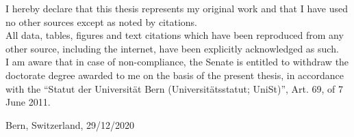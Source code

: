 
\begin{declaration}
	\addchaptertocentry{\authorshipname} %
	
	\vspace{1cm}
	
	 \vspace{0.5cm}
	
	 \vspace{2cm}
	
	{\noindent I  hereby  declare  that  this  thesis represents my  original  work and  that  I  have  used  no  other sources except as noted by citations.\\
		All  data,  tables,  figures  and  text  citations  which  have  been  reproduced  from  any  other source, including the internet, have been explicitly acknowledged as such.\\
		I am aware that in case of non-compliance, the Senate is entitled to withdraw the doctorate degree awarded to me on the basis of the present thesis, in accordance with the “Statut der Universität Bern (Universitätsstatut; UniSt)”, Art. 69, of 7 June 2011.\par} \vspace{1cm}
	
	
	  Bern, Switzerland, 29/12/2020

	  \vspace{1cm}
\end{declaration}


